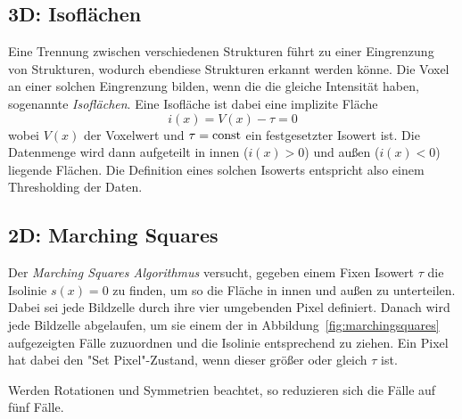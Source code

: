 		\subsection{3D: Isoflächen}
			Eine Trennung zwischen verschiedenen Strukturen führt zu einer Eingrenzung von Strukturen, wodurch ebendiese Strukturen erkannt werden könne. Die Voxel an einer solchen Eingrenzung bilden, wenn die die gleiche Intensität haben, sogenannte \emph{Isoflächen}. Eine Isofläche ist dabei eine implizite Fläche
			\begin{equation*}
				i(x) = V(x) - \tau = 0
			\end{equation*}
			wobei \( V(x) \) der Voxelwert und \( \tau = \operatorname{const} \) ein festgesetzter Isowert ist. Die Datenmenge wird dann aufgeteilt in innen (\( i(x) > 0 \)) und außen (\( i(x) < 0 \)) liegende Flächen. Die Definition eines solchen Isowerts entspricht also einem Thresholding der Daten.

		\subsection{2D: Marching Squares}
			Der \emph{Marching Squares Algorithmus} versucht, gegeben einem Fixen Isowert \( \tau \) die Isolinie \( s(x) = 0 \) zu finden, um so die Fläche in innen und außen zu unterteilen. Dabei sei jede Bildzelle durch ihre vier umgebenden Pixel definiert. Danach wird jede Bildzelle abgelaufen, um sie einem der in Abbildung~\ref{fig:marchingsquares} aufgezeigten Fälle zuzuordnen und die Isolinie entsprechend zu ziehen. Ein Pixel hat dabei den "Set Pixel"-Zustand, wenn dieser größer oder gleich \( \tau \) ist.
			
			Werden Rotationen und Symmetrien beachtet, so reduzieren sich die Fälle auf fünf Fälle.
			
